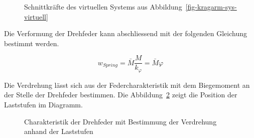 \documentclass[
  11pt,
  letterpaper,
]{scrreprt}
\begin{document}
\begin{figure}[H]


\caption{\label{fig-sk-kragarm-virtuell}Schnittkräfte des virtuellen
Systems aus Abbildung~\ref{fig-kragarm-sys-virtuell}}

\end{figure}%

Die Verformung der Drehfeder kann abschliessend mit der folgenden
Gleichung bestimmt werden.

\[
w_{Spring} = \bar{M} \frac{M}{k_\varphi} = \bar{M} \varphi
\]

Die Verdrehung lässt sich aus der Federcharakteristik mit dem
Biegemoment an der Stelle der Drehfeder bestimmen. Die
Abbildung~\ref{fig-feder-force} zeigt die Position der Laststufen im
Diagramm.

\begin{figure}[H]


\caption{\label{fig-feder-force}Charakteristik der Drehfeder mit
Bestimmung der Verdrehung anhand der Laststufen}

\end{figure}%
\end{document}
